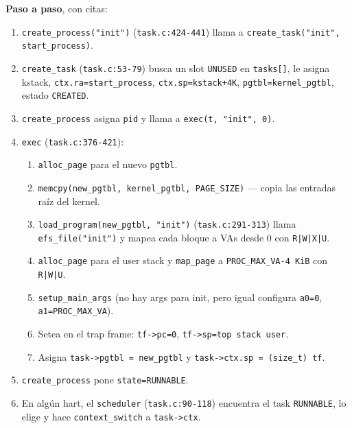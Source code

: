 \documentclass[11pt,a4paper]{article}
\begin{document}
\begin{respuesta}
\textbf{Paso a paso}, con citas:

\begin{enumerate}[leftmargin=*]
    \item \texttt{create\_process("init")} (\texttt{task.c:424-441})
        llama a \texttt{create\_task("init", start\_process)}.
    \item \texttt{create\_task} (\texttt{task.c:53-79}) busca un
        slot \texttt{UNUSED} en \texttt{tasks[]}, le asigna kstack,
        \texttt{ctx.ra=start\_process}, \texttt{ctx.sp=kstack+4K},
        \texttt{pgtbl=kernel\_pgtbl}, estado \texttt{CREATED}.
    \item \texttt{create\_process} asigna \texttt{pid} y llama a
        \texttt{exec(t, "init", 0)}.
    \item \texttt{exec} (\texttt{task.c:376-421}):
        \begin{enumerate}[nosep,label=\alph*)]
            \item \texttt{alloc\_page} para el nuevo \texttt{pgtbl}.
            \item \texttt{memcpy(new\_pgtbl, kernel\_pgtbl,
                PAGE\_SIZE)} — copia las entradas raíz del kernel.
            \item \texttt{load\_program(new\_pgtbl, "init")}
                (\texttt{task.c:291-313}) llama
                \texttt{efs\_file("init")} y mapea cada bloque a
                VAs desde 0 con \texttt{R|W|X|U}.
            \item \texttt{alloc\_page} para el user stack y
                \texttt{map\_page} a \texttt{PROC\_MAX\_VA-4\,KiB}
                con \texttt{R|W|U}.
            \item \texttt{setup\_main\_args} (no hay args para init,
                pero igual configura \texttt{a0=0}, \texttt{a1=PROC\_MAX\_VA}).
            \item Setea en el trap frame: \texttt{tf->pc=0},
                \texttt{tf->sp=top stack user}.
            \item Asigna \texttt{task->pgtbl = new\_pgtbl} y
                \texttt{task->ctx.sp = (size\_t) tf}.
        \end{enumerate}
    \item \texttt{create\_process} pone \texttt{state=RUNNABLE}.
    \item En algún hart, el \texttt{scheduler} (\texttt{task.c:90-118})
        encuentra el task \texttt{RUNNABLE}, lo elige y hace
        \texttt{context\_switch} a \texttt{task->ctx}.

\end{enumerate}
\end{respuesta}
\end{document}

